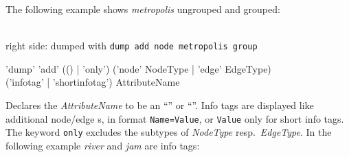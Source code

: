 The following example shows \emph{metropolis} ungrouped and grouped:
\begin{center}
    \hfill {}\\
  {\small right side: dumped with \texttt{dump add node metropolis group}}
\end{center}

\begin{rail}
  'dump' 'add' (() | 'only') ('node' NodeType | 'edge' EdgeType) \\ ('infotag' | 'shortinfotag') AttributeName
\end{rail}
Declares the  \emph{AttributeName} to be an ``'' or ``''.
Info tags are displayed like additional node/edge s, in format \texttt{Name=Value}, or \texttt{Value} only for short info tags. 
The keyword \texttt{only} excludes the subtypes of \emph{NodeType} resp.\ \emph{EdgeType}. 
In the following example \emph{river} and \emph{jam} are info tags:
\begin{center}
\end{center}

